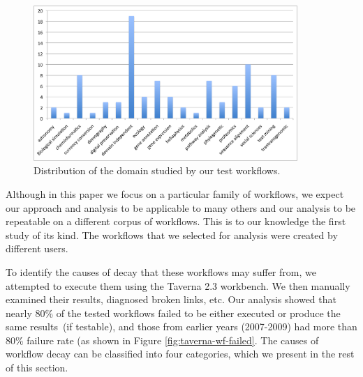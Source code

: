 \begin{figure}[h]
  \begin{center}
    \includegraphics[width=10cm]{./Figures/domain-features.png}
        \caption{Distribution of the domain studied by our test workflows.}
        \label{fig:domain_distribution}
  \end{center}
\end{figure}


Although in this paper we focus on a particular family of workflows, we expect our approach and analysis to be applicable to many others and our analysis to be repeatable on a different corpus of workflows.
This is to our knowledge the first study of its kind. The workflows that we selected for analysis were created by different users. 


To identify the causes of decay that these workflows may suffer from, we attempted to execute them using the Taverna 2.3 workbench. We then manually examined their results, diagnosed broken links, etc. Our analysis showed that nearly 80\% of the tested workflows failed to be either executed or produce the same results~(if testable), and those from earlier years (2007-2009) had more than 80\% failure rate (as shown in Figure \ref{fig:taverna-wf-failed}. The causes of workflow decay can be classified into four categories, which we present in the rest of this section. 



